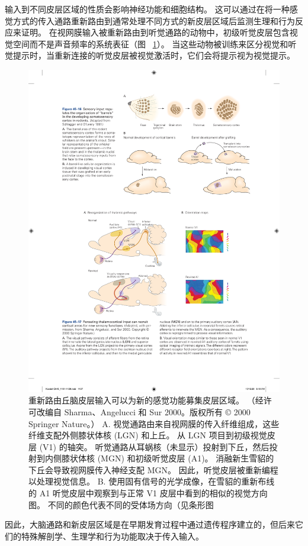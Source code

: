 输入到不同皮层区域的性质会影响神经功能和细胞结构。
这可以通过在将一种感觉方式的传入通路重新路由到通常处理不同方式的新皮层区域后监测生理和行为反应来证明。
在视网膜输入被重新路由到听觉通路的动物中，初级听觉皮层包含视觉空间而不是声音频率的系统表征（图 ~\ref{fig:45_17}）。
当这些动物被训练来区分视觉和听觉提示时，当重新连接的听觉皮层被视觉激活时，它们会将提示视为视觉提示。


\begin{figure}[htbp]
	\centering
	\includegraphics[width=0.8\linewidth]{chap45/fig_45_17}
	\caption{重新路由丘脑皮层输入可以为新的感觉功能募集皮层区域。 （经许可改编自 Sharma、Angelucci 和 Sur 2000。版权所有 © 2000 Springer Nature。） A. 视觉通路由来自视网膜的传入纤维组成，这些纤维支配外侧膝状体核 (LGN) 和上丘。 从 LGN 项目到初级视觉皮层 (V1) 的轴突。 听觉通路从耳蜗核（未显示）投射到下丘，然后投射到内侧膝状体核 (MGN) 和初级听觉皮层 (A1)。 消融新生雪貂的下丘会导致视网膜传入神经支配 MGN。 因此，听觉皮层被重新编程以处理视觉信息。 B. 使用固有信号的光学成像，在雪貂的重新布线的 A1 听觉皮层中观察到与正常 V1 皮层中看到的相似的视觉方向图。 不同的颜色代表不同的受体场方向（见条形图}
	\label{fig:45_17}
\end{figure}


因此，大脑通路和新皮层区域是在早期发育过程中通过遗传程序建立的，但后来它们的特殊解剖学、生理学和行为功能取决于传入输入。



